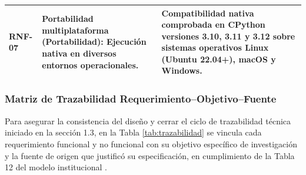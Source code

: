 \begin{table}[H]
\begin{tabularx}{\textwidth}{>{\bfseries\raggedright\arraybackslash}p{2.0cm} >{\raggedright\arraybackslash}p{5.8cm} X}
\addlinespace
RNF-07 & \textbf{Portabilidad multiplataforma} \newline (Portabilidad): Ejecución nativa en diversos entornos operacionales. & Compatibilidad nativa comprobada en CPython versiones 3.10, 3.11 y 3.12 sobre sistemas operativos Linux (Ubuntu 22.04+), macOS y Windows. \\ %
\bottomrule
\end{tabularx}
\end{table}

\subsubsection{Matriz de Trazabilidad Requerimiento--Objetivo--Fuente}
Para asegurar la consistencia del diseño y cerrar el ciclo de trazabilidad técnica iniciado en la sección 1.3, en la Tabla \ref{tab:trazabilidad} se vincula cada requerimiento funcional y no funcional con su objetivo específico de investigación y la fuente de origen que justificó su especificación, en cumplimiento de la Tabla 12 del modelo institucional \parencite{iso2018req, torres2026proyecto}. %

